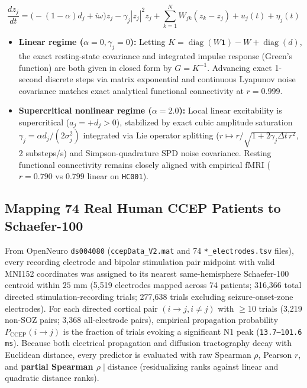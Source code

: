 \documentclass[11pt,a4paper]{article}
\begin{document}
\begin{equation*}\frac{dz_j}{dt} = \big(-(1-\alpha)d_j + i\omega\big) z_j - \gamma_j |z_j|^2 z_j + \sum_{k=1}^N W_{jk}(z_k - z_j) + u_j(t) + \eta_j(t)\end{equation*}
\begin{itemize}
\item \textbf{Linear regime ($\alpha = 0, \gamma_j = 0$):} Letting $K = \operatorname{diag}(W\mathbf{1}) - W + \operatorname{diag}(d)$, the exact resting-state covariance and integrated impulse response (Green's function) are both given in closed form by $G = K^{-1}$. Advancing exact 1-second discrete steps via matrix exponential and continuous Lyapunov noise covariance matches exact analytical functional connectivity at $r = 0.999$.
\item \textbf{Supercritical nonlinear regime ($\alpha = 2.0$):} Local linear excitability is supercritical ($a_j = +d_j > 0$), stabilized by exact cubic amplitude saturation $\gamma_j = \alpha d_j / (2\sigma_j^2)$ integrated via Lie operator splitting ($r \mapsto r / \sqrt{1 + 2\gamma_j \Delta t \, r^2}$, 2 substeps/s) and Simpson-quadrature SPD noise covariance. Resting functional connectivity remains closely aligned with empirical fMRI ($r = 0.790$ vs $0.799$ linear on \texttt{HC001}).
\end{itemize}
\subsection{Mapping 74 Real Human CCEP Patients to Schaefer-100}
From OpenNeuro \texttt{ds004080} (\texttt{ccepData\_V2.mat} and 74 \texttt{*\_electrodes.tsv} files), every recording electrode and bipolar stimulation pair midpoint with valid MNI152 coordinates was assigned to its nearest same-hemisphere Schaefer-100 centroid within $25\text{ mm}$ (5,519 electrodes mapped across 74 patients; 316,366 total directed stimulation-recording trials; 277,638 trials excluding seizure-onset-zone electrodes). For each directed cortical pair $(i \to j, i \ne j)$ with $\ge 10$ trials (3,219 non-SOZ pairs; 3,368 all-electrode pairs), empirical propagation probability $P_{\text{CCEP}}(i \to j)$ is the fraction of trials evoking a significant N1 peak (\texttt{13.7--101.6 ms}). Because both electrical propagation and diffusion tractography decay with Euclidean distance, every predictor is evaluated with raw Spearman $\rho$, Pearson $r$, and \textbf{partial Spearman $\rho \mid \text{distance}$} (residualizing ranks against linear and quadratic distance ranks).
\end{document}
